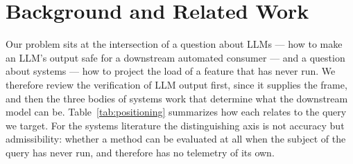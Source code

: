 \documentclass[journal, 10pt]{IEEEtran}
\begin{document}
\begin{enumerate}
\end{enumerate}

\section{Background and Related Work}
\label{sec:background}

Our problem sits at the intersection of a question about LLMs --- how to make an
LLM's output safe for a downstream automated consumer --- and a question about
systems --- how to project the load of a feature that has never run. We therefore
review the verification of LLM output first, since it supplies the frame, and then
the three bodies of systems work that determine what the downstream model can be.
Table~\ref{tab:positioning} summarizes how each relates to the query we target.
For the systems literature the distinguishing axis is not accuracy but
admissibility: whether a method can be evaluated at all when the subject of the
query has never run, and therefore has no telemetry of its own.
\end{document}

